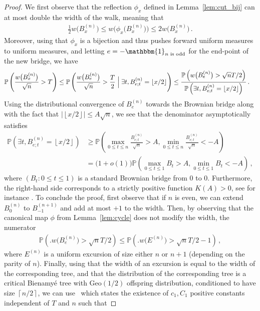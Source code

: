 \documentclass{article}
\newcommand{\pr}{\mathbb{P}}								%
\newcommand{\Prob}[1]{\pr\left(#1\right)}					%
\newcommand{\CProb}[2]{\pr\left(#1 \Bigm| #2\right)}	%
\newcommand{\1}{\mathbbm{1}}								%
\theoremstyle{definition}
\numberwithin{equation}{section}
\newcommand{\floor}[1]{\left\lfloor #1\right\rfloor}
\newcommand{\ceil}[1]{\left\lceil #1 \right\rceil}
\begin{document}
\begin{proof}
We first observe that the reflection $\phi_x$ defined in Lemma~\ref{lem:cut_bij} can at most double the width of the walk, meaning that
\begin{align*}
    \frac{1}{2}w\big(B^{(n)}_x\big)\leq w\big(\phi_x\big(B^{(n)}_x\big)\big)\leq 2w\big(B^{(n)}_x\big) \, .
\end{align*}
Moreover, using that $\phi_x$ is a bijection and thus pushes forward uniform measures to uniform measures, and letting $e=-\mathbbm{1}_{\textrm{$n$ is odd}}$ for the end-point of the new bridge, we have 
\begin{align*}
    \Prob{\frac{w\big(B^{(n)}_x\big)}{\sqrt{n}}>T} &\leq \CProb{\frac{w\big(B^{(n)}_e\big)}{\sqrt{n}}>\frac{T}{2}}{\exists t,B^{(n)}_{e;t}=\floor{x/2}} 
    \leq \frac{\Prob{w\big(B^{(n)}_e\big)>\sqrt{n}T/2}}{\Prob{\exists t,B^{(n)}_{e;t}=\floor{x/2}}} \, .
\end{align*}
Using the distributional convergence of $B^{(n)}_e$ towards the Brownian bridge along with the fact that $|\floor{x/2}|\leq A\sqrt{n}$, we see that the denominator asymptotically satisfies
\begin{align*}
    \Prob{\exists t,B^{(n)}_{e;t}=\floor{x/2}}
    &\geq\Prob{\max_{0\leq t\leq n}\frac{B^{(n)}_{e;t}}{\sqrt{n}}>A,\min_{0\leq t\leq n}\frac{B^{(n)}_{e;t}}{\sqrt{n}}<-A}\\
    &=\big(1+o(1)\big)\Prob{\max_{0\leq t\leq 1}B_t>A,\min_{0\leq t\leq 1}B_t<-A}\,,
\end{align*}
where $(B_t:0\leq t\leq 1)$ is a standard Brownian bridge from $0$ to $0$. Furthermore, the right-hand side corresponds to a strictly positive function $K(A)>0$, see for instance \cite[Formula 1.15.8, Pg 180]{borodin2012handbook}.
To conclude the proof, first observe that if $n$ is even, we can extend $B^{(n)}_0$ to $B^{(n+1)}_{-1}$ and add at most $+1$ to the width.
Then, by observing that the canonical map $\phi$ from Lemma~\ref{lem:cycle} does not modify the width, the numerator
\begin{align*}
    \Prob{\Big.w\big(B^{(n)}_e\big)>\sqrt{n}T/2}\leq\Prob{\Big.w\big(E^{(n)}\big)>\sqrt{n}T/2-1}\,,
\end{align*}
where $E^{(n)}$ is a uniform excursion of size either $n$ or $n+1$ (depending on the parity of $n$).
Finally, using that the width of an excursion is equal to the width of the corresponding tree, and that the distribution of the corresponding tree is a critical Bienamyé tree with $\mathrm{Geo}(1/2)$ offspring distribution, conditioned to have size $\ceil{n/2}$, we can use~\cite[Theorem 1.1]{LAB_LD_SJ_13} which states the existence of $c_1, C_1$ positive constants independent of $T$ and $n$ such that

\end{proof}
\end{document}
